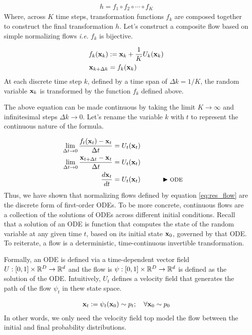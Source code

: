 \documentclass[a4paper, 11pt]{article}
\begin{document}
\begin{align}
    h = f_1 \circ f_2 \circ  \cdots \circ f_K
\end{align}
Where, across $K$ time steps, transformation functions $f_k$ are composed together to construct the final transformation $h$. Let's construct a composite flow based on simple normalizing flows \textit{i.e.} $f_k$ is bijective.

\begin{align}\label{eq:res_flow}
    f_k(\mbox{$\mbox{$\mathbf{x}$}$}_k) &:= \mbox{$\mbox{$\mathbf{x}$}$}_k + \frac{1}{K}U_k(\mbox{$\mbox{$\mathbf{x}$}$}_k) \\
    \mbox{$\mbox{$\mathbf{x}$}$}_{k + \Delta k} &= f_k(\mbox{$\mbox{$\mathbf{x}$}$}_k)
\end{align}
At each discrete time step $k$, defined by a time span of $\Delta k = 1/K$, the random variable $\mbox{$\mbox{$\mathbf{x}$}$}_k$ is transformed by the function $f_k$ defined above.

The above equation can be made continuous by taking the limit $K \to \infty$ and infinitesimal steps $\Delta k \to 0$. Let's rename the variable $k$ with $t$ to represent the continuous nature of the formula.

\begin{align}\label{eq:flow_ode}
    \lim_{\Delta t \to 0} \frac{f_t(\mbox{$\mbox{$\mathbf{x}$}$}_t) - \mbox{$\mbox{$\mathbf{x}$}$}_t}{\Delta t} &= U_t(\mbox{$\mbox{$\mathbf{x}$}$}_t)\\
    \lim_{\Delta t \to 0} \frac{ \mbox{$\mbox{$\mathbf{x}$}$}_{t + \Delta t} - \mbox{$\mbox{$\mathbf{x}$}$}_t}{\Delta t} &= U_t(\mbox{$\mbox{$\mathbf{x}$}$}_t) \\ 
    \frac{d \mbox{$\mbox{$\mathbf{x}$}$}_t}{dt} &= U_t(\mbox{$\mbox{$\mathbf{x}$}$}_t) && \qquad \blacktriangleright\text{\footnotesize ODE}
\end{align}
Thus, we have shown that normalizing flows defined by equation \eqref{eq:res_flow} are the discrete form of first-order ODEs. To be more concrete, continuous flows are a collection of the solutions of ODEs across different initial conditions. Recall that a solution of an ODE is function that computes the state of the random variable at any given time $t$, based on its initial state $\mbox{$\mbox{$\mathbf{x}$}$}_0$, governed by that ODE. To reiterate, a flow is a deterministic, time-continuous invertible transformation.
   

Formally, an ODE is defined via a time-dependent vector field $U:[0, 1] \times \mathbb{R}^D \to \mathbb{R}^d$ and the flow is $\psi:[0,1] \times \mathbb{R}^D \to \mathbb{R}^d$ is defined as the solution of the ODE. Intuitively, $U_t$ defines a velocity field that generates the path of the flow $\psi_t$ in thew state space. 

\begin{align}
    \mbox{$\mbox{$\mathbf{x}$}$}_t := \psi_t(\mbox{$\mbox{$\mathbf{x}$}$}_0) \sim p_t; \quad \forall \mbox{$\mbox{$\mathbf{x}$}$}_0 \sim p_0
\end{align}
In other words, we only need the velocity field top model the flow between the initial and final probability distributions.
\end{document}
